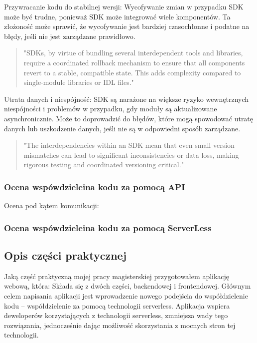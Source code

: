 \documentclass[runningheads,12pt]{llncs}
\begin{document}
Przywracanie kodu do stabilnej wersji: Wycofywanie zmian w przypadku SDK może być trudne, ponieważ SDK może integrować wiele komponentów. Ta złożoność może sprawić, że wycofywanie jest bardziej czasochłonne i podatne na błędy, jeśli nie jest zarządzane prawidłowo.

\begin{quote}
    "SDKs, by virtue of bundling several interdependent tools and libraries, require a coordinated rollback mechanism to ensure that all components revert to a stable, compatible state. This adds complexity compared to single-module libraries or IDL files." ~\cite[para. 3]{azure2020}
\end{quote}

Utrata danych i niespójność: SDK są narażone na większe ryzyko wewnętrznych niespójności i problemów w przypadku, gdy moduły są aktualizowane asynchronicznie. Może to doprowadzić do błędów, które mogą spowodować utratę danych lub uszkodzenie danych, jeśli nie są w odpowiedni sposób zarządzane.

\begin{quote}
    "The interdependencies within an SDK mean that even small version mismatches can lead to significant inconsistencies or data loss, making rigorous testing and coordinated versioning critical." ~\cite[para. 3]{azure2020}
\end{quote}

\subsubsection{Ocena wspówdzieleina kodu za pomocą API}

Ocena pod kątem komunikacji: 

\subsubsection{Ocena wspówdzieleina kodu za pomocą ServerLess}

\subsection{Opis części praktycznej}

Jaką część praktyczną mojej pracy magisterskiej przygotowałem aplikację webową, która:
Składa się z dwóch części, backendowej i frontendowej.
Głównym celem napisania aplikacji jest wprowadzenie nowego podejścia do współdzielenie kodu – współdzielenie za pomocą technologii serverless. Aplikacja wspiera deweloperów korzystających z technologii serverless, zmniejsza wady tego rozwiązania, jednocześnie dając możliwość skorzystania z mocnych stron tej technologii.
\end{document}

